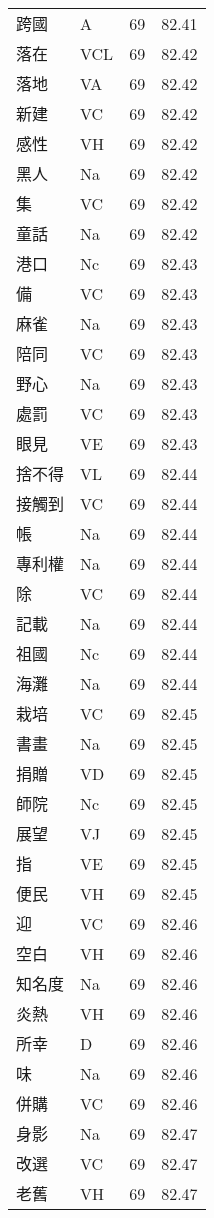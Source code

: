 \documentclass[twocolumn]{book}
\begin{document}
\begin{supertabular}{llrr}
跨國 & A & 69 &  82.41\\
落在 & VCL & 69 &  82.42\\
落地 & VA & 69 &  82.42\\
新建 & VC & 69 &  82.42\\
感性 & VH & 69 &  82.42\\
黑人 & Na & 69 &  82.42\\
集 & VC & 69 &  82.42\\
童話 & Na & 69 &  82.42\\
港口 & Nc & 69 &  82.43\\
備 & VC & 69 &  82.43\\
麻雀 & Na & 69 &  82.43\\
陪同 & VC & 69 &  82.43\\
野心 & Na & 69 &  82.43\\
處罰 & VC & 69 &  82.43\\
眼見 & VE & 69 &  82.43\\
捨不得 & VL & 69 &  82.44\\
接觸到 & VC & 69 &  82.44\\
帳 & Na & 69 &  82.44\\
專利權 & Na & 69 &  82.44\\
除 & VC & 69 &  82.44\\
記載 & Na & 69 &  82.44\\
祖國 & Nc & 69 &  82.44\\
海灘 & Na & 69 &  82.44\\
栽培 & VC & 69 &  82.45\\
書畫 & Na & 69 &  82.45\\
捐贈 & VD & 69 &  82.45\\
師院 & Nc & 69 &  82.45\\
展望 & VJ & 69 &  82.45\\
指 & VE & 69 &  82.45\\
便民 & VH & 69 &  82.45\\
迎 & VC & 69 &  82.46\\
空白 & VH & 69 &  82.46\\
知名度 & Na & 69 &  82.46\\
炎熱 & VH & 69 &  82.46\\
所幸 & D & 69 &  82.46\\
味 & Na & 69 &  82.46\\
併購 & VC & 69 &  82.46\\
身影 & Na & 69 &  82.47\\
改選 & VC & 69 &  82.47\\
老舊 & VH & 69 &  82.47\\

\end{supertabular}
\end{document}

